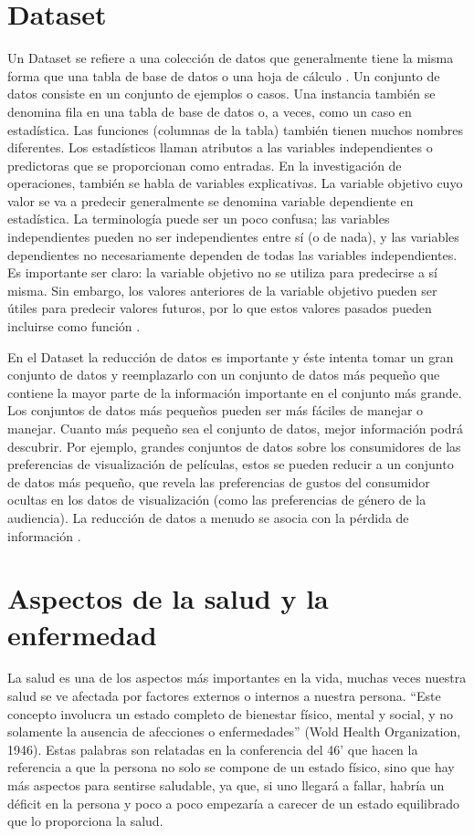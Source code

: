 \section{Dataset}
Un Dataset se refiere a una colección de datos que generalmente tiene la misma forma que una tabla de base de datos o una hoja de cálculo \cite{Astudillo2021}. Un conjunto de datos consiste en un conjunto de ejemplos o casos. Una instancia también se denomina fila en una tabla de base de datos o, a veces, como un caso en estadística. Las funciones (columnas de la tabla) también tienen muchos nombres diferentes. Los estadísticos llaman atributos a las variables independientes o predictoras que se proporcionan como entradas. En la investigación de operaciones, también se habla de variables explicativas. La variable objetivo cuyo valor se va a predecir generalmente se denomina variable dependiente en estadística. La terminología puede ser un poco confusa; las variables independientes pueden no ser independientes entre sí (o de nada), y las variables dependientes no necesariamente dependen de todas las variables independientes. Es importante ser claro: la variable objetivo no se utiliza para predecirse a sí misma. Sin embargo, los valores anteriores de la variable objetivo pueden ser útiles para predecir valores futuros, por lo que estos valores pasados pueden incluirse como función \cite{provost2013data}.\\
\par En el Dataset la reducción de datos es importante y éste intenta tomar un gran conjunto de datos y reemplazarlo con un conjunto de datos más pequeño que contiene la mayor parte de la información importante en el conjunto más grande. Los conjuntos de datos más pequeños pueden ser más fáciles de manejar o manejar. Cuanto más pequeño sea el conjunto de datos, mejor información podrá descubrir. Por ejemplo, grandes conjuntos de datos sobre los consumidores de las preferencias de visualización de películas, estos se pueden reducir a un conjunto de datos más pequeño, que revela las preferencias de gustos del consumidor ocultas en los datos de visualización (como las preferencias de género de la audiencia). La reducción de datos a menudo se asocia con la pérdida de información \cite{provost2013data}.\\

\doublespacing
\section{Aspectos de la salud y la enfermedad}
La salud es una de los aspectos más importantes en la vida, muchas veces nuestra salud se ve afectada por factores externos o internos a nuestra persona. “Este concepto involucra un estado completo de bienestar físico, mental y social, y no solamente la ausencia de afecciones o enfermedades” (Wold Health Organization, 1946). Estas palabras son relatadas en la conferencia del 46’ que hacen la referencia a que la persona no solo se compone de un estado físico, sino que hay más aspectos para sentirse saludable, ya que, si uno llegará a fallar, habría un déficit en la persona y poco a poco empezaría a carecer de un estado equilibrado que lo proporciona la salud. \\

